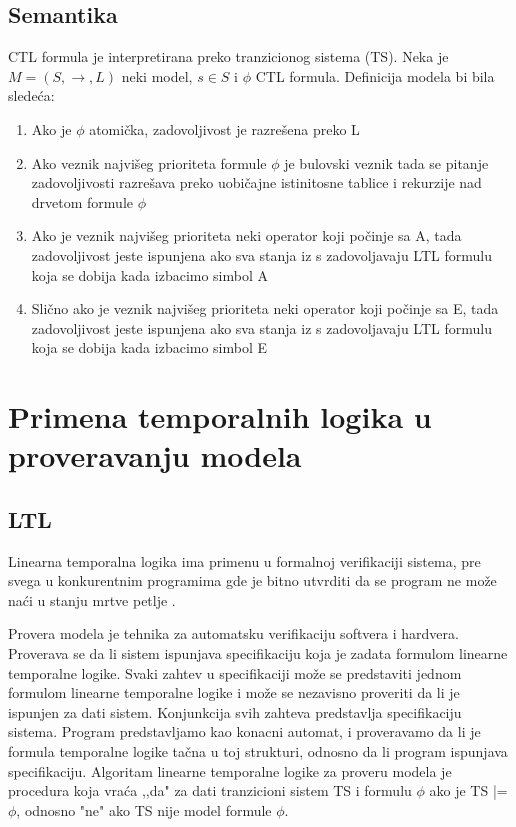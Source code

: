 \documentclass[a4paper]{article}
\begin{document}
{	\subsection{Semantika}
	\label{subsec:podnaslovN}
	CTL formula je interpretirana preko tranzicionog sistema (TS). Neka je $M = (S,\rightarrow, L)$ neki model, $s \in S$ i $\phi$ CTL formula.
	Definicija modela bi bila sledeća:
	\begin{enumerate}	
\item Ako je $\phi$ atomička, zadovoljivost je razrešena preko L
\item  Ako veznik najvišeg prioriteta formule $\phi$ je bulovski veznik tada se pitanje zadovoljivosti razrešava
		   preko uobičajne istinitosne tablice i rekurzije nad drvetom formule $\phi$
\item  Ako je veznik najvišeg prioriteta neki operator koji počinje sa A, tada zadovoljivost jeste ispunjena ako
		   sva stanja iz s zadovoljavaju LTL formulu koja se dobija kada izbacimo simbol A 
\item  Slično ako je veznik najvišeg prioriteta neki operator koji počinje sa E, tada zadovoljivost jeste ispunjena ako
		   sva stanja iz s zadovoljavaju LTL formulu koja se dobija kada izbacimo simbol E 
\end{enumerate}	

	\section{Primena temporalnih logika u proveravanju modela}
	\label{sec:MC}

\subsection{LTL}
	\label{subsec:prLTL}
	Linearna temporalna logika ima primenu u formalnoj verifikaciji sistema, pre svega u konkurentnim programima gde je bitno utvrditi da se program ne može naći u stanju mrtve petlje \cite{baier2008principles}. 
	
	Provera modela je tehnika za automatsku verifikaciju softvera i hardvera. Proverava se da li sistem ispunjava specifikaciju koja je zadata formulom linearne temporalne logike. 
	Svaki zahtev u specifikaciji može se predstaviti jednom formulom linearne temporalne logike i može se nezavisno proveriti da li je ispunjen za dati sistem. Konjunkcija svih zahteva predstavlja specifikaciju sistema.
	Program predstavljamo kao konacni automat, i proveravamo da li je formula temporalne logike tačna u toj strukturi, odnosno da li program ispunjava specifikaciju.
	Algoritam linearne temporalne logike za proveru modela je procedura koja vraća ,,da" za dati tranzicioni sistem TS i formulu $\phi$ ako je TS |= $\phi$, odnosno "ne" ako TS nije model formule $\phi$.

}
\end{document}
